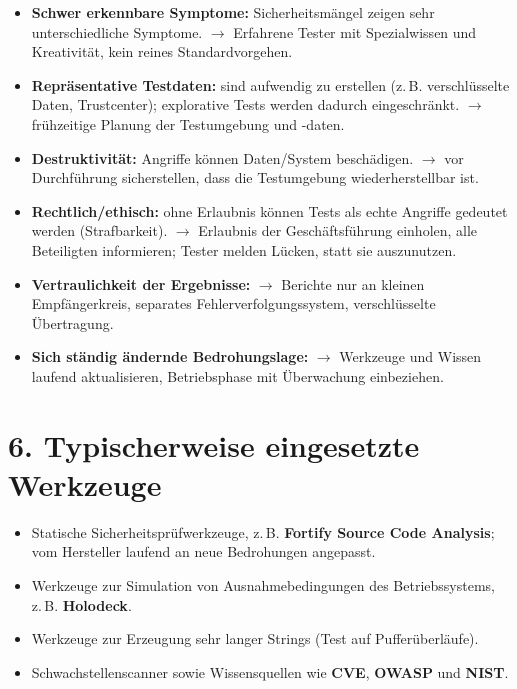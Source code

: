 \documentclass[
	fontsize=12pt,          %
	paper=a4,               %
	numbers=noenddot,       %
	listof=totoc,           %
	listof=entryprefix,     %
	listof=nochaptergap,    %
	bibliography=totoc,     %
	parskip=half,           %
	openany                 %
]{scrbook}
\begin{document}
\begin{itemize}
	\item \textbf{Schwer erkennbare Symptome:} Sicherheitsmängel zeigen sehr
	      unterschiedliche Symptome.
	      $\rightarrow$ Erfahrene Tester mit Spezialwissen und Kreativität, kein
	      reines Standardvorgehen.
	\item \textbf{Repräsentative Testdaten:} sind aufwendig zu erstellen
	      (z.\,B. verschlüsselte Daten, Trustcenter); explorative Tests werden
	      dadurch eingeschränkt.
	      $\rightarrow$ frühzeitige Planung der Testumgebung und -daten.
	\item \textbf{Destruktivität:} Angriffe können Daten/System beschädigen.
	      $\rightarrow$ vor Durchführung sicherstellen, dass die Testumgebung
	      wiederherstellbar ist.
	\item \textbf{Rechtlich/ethisch:} ohne Erlaubnis können Tests als echte
	      Angriffe gedeutet werden (Strafbarkeit).
	      $\rightarrow$ Erlaubnis der Geschäftsführung einholen, alle Beteiligten
	      informieren; Tester melden Lücken, statt sie auszunutzen.
	\item \textbf{Vertraulichkeit der Ergebnisse:}
	      $\rightarrow$ Berichte nur an kleinen Empfängerkreis, separates
	      Fehlerverfolgungssystem, verschlüsselte Übertragung.
	\item \textbf{Sich ständig ändernde Bedrohungslage:}
	      $\rightarrow$ Werkzeuge und Wissen laufend aktualisieren, Betriebsphase
	      mit Überwachung einbeziehen.
\end{itemize}

\section*{6. Typischerweise eingesetzte Werkzeuge}

\begin{itemize}
	\item Statische Sicherheitsprüfwerkzeuge, z.\,B. \textbf{Fortify Source Code
	      Analysis}; vom Hersteller laufend an neue Bedrohungen angepasst.
	\item Werkzeuge zur Simulation von Ausnahmebedingungen des Betriebssystems,
	      z.\,B. \textbf{Holodeck}.
	\item Werkzeuge zur Erzeugung sehr langer Strings (Test auf Pufferüberläufe).
	\item Schwachstellenscanner sowie Wissensquellen wie \textbf{CVE}, \textbf{OWASP}
	      und \textbf{NIST}.
\end{itemize}
\end{document}

